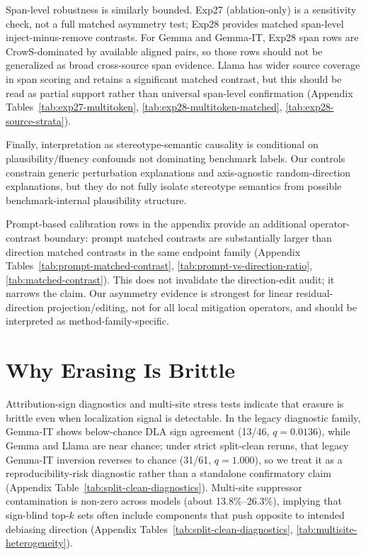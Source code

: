 Span-level robustness is similarly bounded. Exp27 (ablation-only) is a sensitivity check, not a full matched asymmetry test; Exp28 provides matched span-level inject-minus-remove contrasts. For Gemma and Gemma-IT, Exp28 span rows are CrowS-dominated by available aligned pairs, so those rows should not be generalized as broad cross-source span evidence. Llama has wider source coverage in span scoring and retains a significant matched contrast, but this should be read as partial support rather than universal span-level confirmation (Appendix Tables~\ref{tab:exp27-multitoken}, \ref{tab:exp28-multitoken-matched}, \ref{tab:exp28-source-strata}).

Finally, interpretation as stereotype-semantic causality is conditional on plausibility/fluency confounds not dominating benchmark labels. Our controls constrain generic perturbation explanations and axis-agnostic random-direction explanations, but they do not fully isolate stereotype semantics from possible benchmark-internal plausibility structure.

Prompt-based calibration rows in the appendix provide an additional operator-contrast boundary: prompt matched contrasts are substantially larger than direction matched contrasts in the same endpoint family (Appendix Tables~\ref{tab:prompt-matched-contrast}, \ref{tab:prompt-vs-direction-ratio}, \ref{tab:matched-contrast}). This does not invalidate the direction-edit audit; it narrows the claim. Our asymmetry evidence is strongest for linear residual-direction projection/editing, not for all local mitigation operators, and should be interpreted as method-family-specific.

\FloatBarrier
\section{Why Erasing Is Brittle}
\label{sec:brittle}

Attribution-sign diagnostics and multi-site stress tests indicate that erasure is brittle even when localization signal is detectable. In the legacy diagnostic family, Gemma-IT shows below-chance DLA sign agreement (13/46, $q=0.0136$), while Gemma and Llama are near chance; under strict split-clean reruns, that legacy Gemma-IT inversion reverses to chance (31/61, $q=1.000$), so we treat it as a reproducibility-risk diagnostic rather than a standalone confirmatory claim (Appendix Table~\ref{tab:split-clean-diagnostics}). Multi-site suppressor contamination is non-zero across models (about 13.8\%--26.3\%), implying that sign-blind top-$k$ sets often include components that push opposite to intended debiasing direction (Appendix Tables~\ref{tab:split-clean-diagnostics}, \ref{tab:multisite-heterogeneity}).

